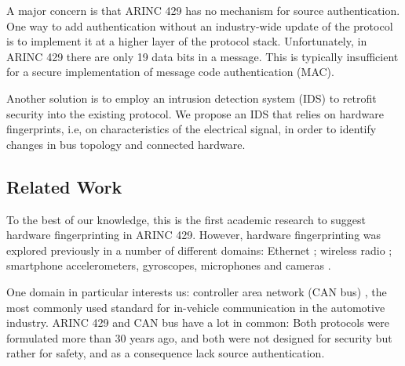 \documentclass[english]{llncs}
\newcommand{\sublevel}[1]{\subsection{#1}}
\newcommand{\sublevel}[1]{\section{#1}}
\begin{document}
  A major concern is that ARINC 429 has no mechanism for source authentication.
  One way to add authentication without an industry-wide update of the protocol is to implement it at a higher layer of the protocol stack. Unfortunately, in ARINC 429 there are only 19 data bits in a message. This is typically insufficient for a secure implementation of message code authentication (MAC).
  
  Another solution is to employ an intrusion detection system (IDS) to retrofit security into the existing protocol. We propose an IDS that relies on hardware fingerprints, i.e, on characteristics of the electrical signal, in order to identify changes in bus topology and connected hardware.
  

\vspace*{-1ex}
\sublevel{Related Work} \label{RelatedWork}
  To the best of our knowledge, this is the first academic research to suggest hardware fingerprinting in ARINC 429. However, hardware fingerprinting was explored previously in a number of different domains: Ethernet \cite{kohno2005remote, uluagac2013passive, gerdes2012physical}; wireless radio \cite{ellis2001characteristics, brik2008wireless, xu2015device}; smartphone accelerometers, gyroscopes, microphones and cameras \cite{dey2014accelprint, das2016tracking}.
  
  One domain in particular interests
  us: controller area network (CAN bus) \cite{bosch1991canbus}, the most commonly used standard for in-vehicle communication in the automotive industry. ARINC 429 and CAN bus have a lot in common: Both protocols were formulated more than 30 years ago, and both were not designed for security but rather for safety, and as a consequence lack source authentication.
  
\end{document}
